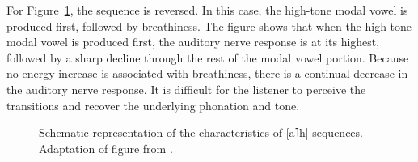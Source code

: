 For Figure~\ref{fig:silverman_19}, the sequence is reversed. In this case, the high-tone modal vowel is produced first, followed by breathiness. The figure shows that when the high tone modal vowel is produced first, the auditory nerve response is at its highest, followed by a sharp decline through the rest of the modal vowel portion. Because no energy increase is associated with breathiness, there is a continual decrease in the auditory nerve response. It is difficult for the listener to perceive the transitions and recover the underlying phonation and tone.
\begin{figure}[h!]
    \centering
    \caption{Schematic representation of the characteristics of [a˥h] sequences. Adaptation of figure from \citet{silvermanLaryngealComplexityOtomanguean1997}.}
    \label{fig:silverman_19}
\end{figure}

